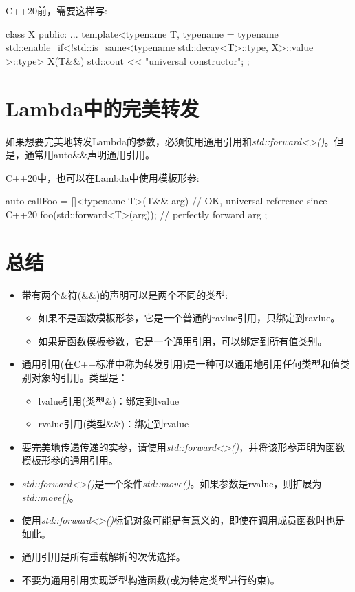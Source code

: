 C++20前，需要这样写:\par

\begin{codebox}[cpp]
class X {
  public:
  ...
  template<typename T,
  typename
  = typename std::enable_if<!std::is_same<typename std::decay<T>::type,
  X>::value
  >::type>
  X(T&&) {
    std::cout << "universal constructor\n";
  }
};
\end{codebox}


\section{Lambda中的完美转发}

如果想要完美地转发Lambda的参数，必须使用通用引用和\textit{std::\allowbreak{}forward<\allowbreak{}>(\allowbreak{})\allowbreak{}}。但是，通常用auto\&\&声明通用引用。\par

C++20中，也可以在Lambda中使用模板形参:\par

\begin{codebox}[cpp]
auto callFoo = []<typename T>(T&& arg) { // OK, universal reference since C++20
  foo(std::forward<T>(arg)); // perfectly forward arg
};
\end{codebox}


\section{总结}

\begin{itemize}
  \item 带有两个\&符(\&\&)的声明可以是两个不同的类型:
  \begin{itemize}
    \item[-] 如果不是函数模板形参，它是一个普通的ravlue引用，只绑定到ravlue。
    \item[-] 如果是函数模板参数，它是一个通用引用，可以绑定到所有值类别。
  \end{itemize}
  \item 通用引用(在C++标准中称为转发引用)是一种可以通用地引用任何类型和值类别对象的引用。类型是：
    \begin{itemize}
    \item[-] lvalue引用(类型\&)：绑定到lvalue
    \item[-] rvalue引用(类型\&\&)：绑定到rvalue
  \end{itemize}
  \item 要完美地传递传递的实参，请使用\textit{std::\allowbreak{}forward<\allowbreak{}>(\allowbreak{})\allowbreak{}}，并将该形参声明为函数模板形参的通用引用。
  \item \textit{std::\allowbreak{}forward<\allowbreak{}>(\allowbreak{})\allowbreak{}}是一个条件\textit{std::move()}。如果参数是rvalue，则扩展为\textit{std::move()}。
  \item 使用\textit{std::\allowbreak{}forward<\allowbreak{}>(\allowbreak{})\allowbreak{}}标记对象可能是有意义的，即使在调用成员函数时也是如此。
  \item 通用引用是所有重载解析的次优选择。
  \item 不要为通用引用实现泛型构造函数(或为特定类型进行约束)。
\end{itemize}
